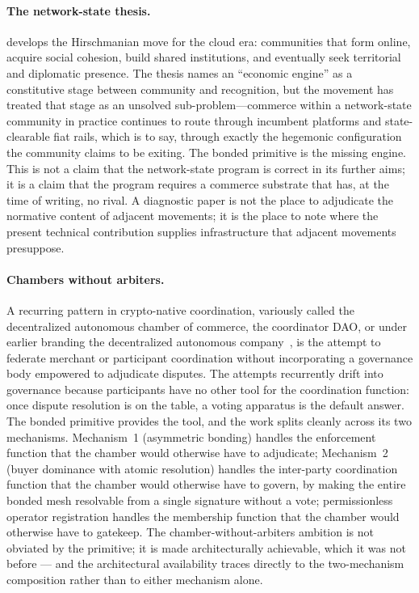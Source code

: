 \documentclass[11pt,a4paper]{article}
\theoremstyle{remark}
\begin{document}
\paragraph{The network-state thesis.}
\citet{srinivasan2022network} develops the Hirschmanian move for
the cloud era: communities that form online, acquire social
cohesion, build shared institutions, and eventually seek
territorial and diplomatic presence. The thesis names an
``economic engine'' as a constitutive stage between community and
recognition, but the movement has treated that stage as an
unsolved sub-problem---commerce within a network-state community in
practice continues to route through incumbent platforms and
state-clearable fiat rails, which is to say, through exactly the
hegemonic configuration the community claims to be exiting. The
bonded primitive is the missing engine. This is not a claim that
the network-state program is correct in its further aims; it is a
claim that the program requires a commerce substrate that has, at
the time of writing, no rival. A diagnostic paper is not the place
to adjudicate the normative content of adjacent movements; it is
the place to note where the present technical contribution
supplies infrastructure that adjacent movements presuppose.

\paragraph{Chambers without arbiters.}
A recurring pattern in crypto-native coordination, variously called
the decentralized autonomous chamber of commerce, the coordinator
DAO, or under earlier branding the decentralized autonomous
company~\citep{larimer2014dac}, is the attempt to federate merchant
or participant coordination without incorporating a governance body
empowered to adjudicate disputes. The attempts recurrently drift
into governance because participants have no other tool for the
coordination function: once dispute resolution is on the table, a
voting apparatus is the default answer. The bonded primitive
provides the tool, and the work splits cleanly across its two
mechanisms. Mechanism~1 (asymmetric bonding) handles the
enforcement function that the chamber would otherwise have to
adjudicate; Mechanism~2 (buyer dominance with atomic resolution)
handles the inter-party coordination function that the chamber
would otherwise have to govern, by making the entire bonded mesh
resolvable from a single signature without a vote;
permissionless operator registration handles the membership
function that the chamber would otherwise have to gatekeep.
The chamber-without-arbiters ambition is not obviated by the
primitive; it is made architecturally achievable, which it was
not before --- and the architectural availability traces directly
to the two-mechanism composition rather than to either mechanism
alone.
\end{document}
